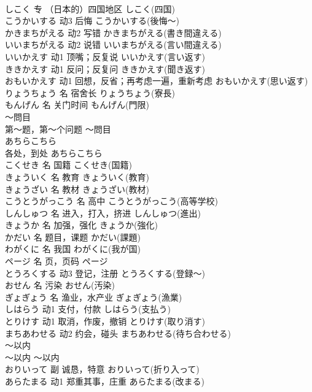 \documentclass[8pt]{extreport}
\begin{document}
\begin{CJK}{UTF8}{min}
\\	しこく	专	（日本的）四国地区	しこく(四国)	
\\	こうかいする	动3	后悔	こうかいする(後悔～)	
\\	かきまちがえる	动2	写错	かきまちがえる(書き間違える)	
\\	いいまちがえる	动2	说错	いいまちがえる(言い間違える)	
\\	いいかえす	动1	顶嘴；反复说	いいかえす(言い返す)	
\\	ききかえす	动1	反问；反复问	ききかえす(聞き返す)	
\\	おもいかえす	动1	回想，反省；再考虑一遍，重新考虑	おもいかえす(思い返す)	
\\	りょうちょう	名	宿舍长	りょうちょう(寮長)	
\\	もんげん	名	关门时间	もんげん(門限)	
\\	～問目	
\\	第～题，第～个问题	～問目	
\\	あちらこちら	
\\	各处，到处	あちらこちら	
\\	こくせき	名	国籍	こくせき(国籍)	
\\	きょういく	名	教育	きょういく(教育)	
\\	きょうざい	名	教材	きょうざい(教材)	
\\	こうとうがっこう	名	高中	こうとうがっこう(高等学校)	
\\	しんしゅつ	名	进入，打入，挤进	しんしゅつ(進出)	
\\	きょうか	名	加强，强化	きょうか(強化)	
\\	かだい	名	题目，课题	かだい(課題)	
\\	わがくに	名	我国	わがくに(我が国)	
\\	ページ	名	页，页码	ページ	
\\	とうろくする	动3	登记，注册	とうろくする(登録～)	
\\	おせん	名	污染	おせん(汚染)	
\\	ぎょぎょう	名	渔业，水产业	ぎょぎょう(漁業)	
\\	しはらう	动1	支付，付款	しはらう(支払う)	
\\	とりけす	动1	取消，作废，撤销	とりけす(取り消す)	
\\	まちあわせる	动2	约会，碰头	まちあわせる(待ち合わせる)	
\\	～以内	
\\	～以内	～以内	
\\	おりいって	副	诚恳，特意	おりいって(折り入って)	
\\	あらたまる	动1	郑重其事，庄重	あらたまる(改まる)	

\end{CJK}
\end{document}
